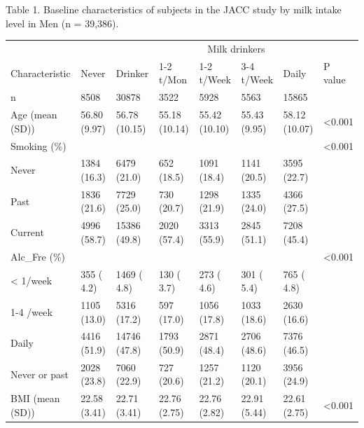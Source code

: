 \documentclass[]{tufte-handout}
\begin{document}
\begin{table}[!htbp]

Table 1. Baseline characteristics of subjects in the JACC study by milk intake level in Men (n = 39,386).

\centering
\fontsize{8}{10}\selectfont
\begin{tabular}[t]{llllllll}
\toprule
\multicolumn{1}{c}{ } & \multicolumn{1}{c}{} & \multicolumn{1}{c}{} & \multicolumn{4}{c}{Milk drinkers} & \multicolumn{1}{c}{} \\
\cmidrule(l{3pt}r{3pt}){4-7}
Characteristic & Never & Drinker & 1-2 t/Mon & 1-2 t/Week & 3-4 t/Week & Daily & P value\\
\midrule
\rowcolor{gray!6}  n & 8508 & 30878 & 3522 & 5928 & 5563 & 15865 & \\
Age (mean (SD)) & 56.80 (9.97) & 56.78 (10.15) & 55.18 (10.14) & 55.42 (10.10) & 55.43 (9.95) & 58.12 (10.07) & <0.001\\
\rowcolor{gray!6}  Smoking (\%) &  &  &  &  &  &  & <0.001\\
\hspace{1em}Never & 1384 (16.3) & 6479 (21.0) & 652 (18.5) & 1091 (18.4) & 1141 (20.5) & 3595 (22.7) & \\
\rowcolor{gray!6}  \hspace{1em}Past & 1836 (21.6) & 7729 (25.0) & 730 (20.7) & 1298 (21.9) & 1335 (24.0) & 4366 (27.5) & \\
\hspace{1em}Current & 4996 (58.7) & 15386 (49.8) & 2020 (57.4) & 3313 (55.9) & 2845 (51.1) & 7208 (45.4) & \\
\rowcolor{gray!6}  Alc\_Fre (\%) &  &  &  &  &  &  & <0.001\\
\hspace{1em}< 1/week & 355 ( 4.2) & 1469 ( 4.8) & 130 ( 3.7) & 273 ( 4.6) & 301 ( 5.4) & 765 ( 4.8) & \\
\rowcolor{gray!6}  \hspace{1em}1-4 /week & 1105 (13.0) & 5316 (17.2) & 597 (17.0) & 1056 (17.8) & 1033 (18.6) & 2630 (16.6) & \\
\hspace{1em}Daily & 4416 (51.9) & 14746 (47.8) & 1793 (50.9) & 2871 (48.4) & 2706 (48.6) & 7376 (46.5) & \\
\rowcolor{gray!6}  \hspace{1em}Never or past & 2028 (23.8) & 7060 (22.9) & 727 (20.6) & 1257 (21.2) & 1120 (20.1) & 3956 (24.9) & \\
BMI (mean (SD)) & 22.58 (3.41) & 22.71 (3.41) & 22.76 (2.75) & 22.76 (2.82) & 22.91 (5.44) & 22.61 (2.75) & <0.001\\

\end{tabular}
\end{table}
\end{document}
